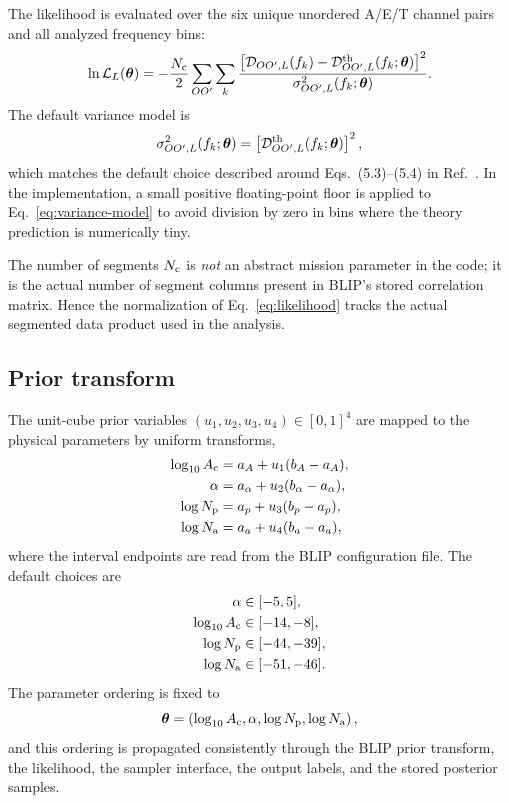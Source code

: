 \documentclass[11pt]{article}
\newcommand{\Nc}{N_{\rm c}}
\newcommand{\Dobs}{\mathcal{D}}
\newcommand{\Dth}{\mathcal{D}^{\rm th}}
\newcommand{\OO}{OO^\prime}
\newcommand{\vect}[1]{\bm{#1}}
\begin{document}
The likelihood is evaluated over the six unique unordered A/E/T channel pairs and all analyzed frequency bins:
\begin{equation}
  \ln \mathcal{L}_L(\vect{\theta})
  =
  -\frac{\Nc}{2}
  \sum_{\OO}
  \sum_{k}
  \frac{
    \left[
      \Dobs_{\OO,L}(f_k)
      -
      \Dth_{\OO,L}(f_k;\vect{\theta})
    \right]^2
  }{
    \sigma^2_{\OO,L}(f_k;\vect{\theta})
  }.
  \label{eq:likelihood}
\end{equation}
The default variance model is
\begin{equation}
  \sigma^2_{\OO,L}(f_k;\vect{\theta})
  =
  \left[
    \Dth_{\OO,L}(f_k;\vect{\theta})
  \right]^2,
  \label{eq:variance-model}
\end{equation}
which matches the default choice described around Eqs.~(5.3)--(5.4) in Ref.~\cite{LISAAnisotropyPaper}.  In the implementation, a small positive floating-point floor is applied to Eq.~\eqref{eq:variance-model} to avoid division by zero in bins where the theory prediction is numerically tiny.

The number of segments $\Nc$ is \emph{not} an abstract mission parameter in the code; it is the actual number of segment columns present in BLIP's stored correlation matrix.  Hence the normalization of Eq.~\eqref{eq:likelihood} tracks the actual segmented data product used in the analysis.

\subsection{Prior transform}

The unit-cube prior variables $(u_1,u_2,u_3,u_4)\in[0,1]^4$ are mapped to the physical parameters by uniform transforms,
\begin{align}
  \log_{10}A_{\rm c} &= a_A + u_1(b_A-a_A), \\
  \alpha             &= a_\alpha + u_2(b_\alpha-a_\alpha), \\
  \log N_{\rm p}     &= a_p + u_3(b_p-a_p), \\
  \log N_{\rm a}     &= a_a + u_4(b_a-a_a),
\end{align}
where the interval endpoints are read from the BLIP configuration file.  The default choices are
\begin{align}
  \alpha &\in [-5,5], \\
  \log_{10}A_{\rm c} &\in [-14,-8], \\
  \log N_{\rm p} &\in [-44,-39], \\
  \log N_{\rm a} &\in [-51,-46].
\end{align}
The parameter ordering is fixed to
\begin{equation}
  \vect{\theta}
  =
  \left(
  \log_{10}A_{\rm c},
  \alpha,
  \log N_{\rm p},
  \log N_{\rm a}
  \right),
  \label{eq:theta-ordering}
\end{equation}
and this ordering is propagated consistently through the BLIP prior transform, the likelihood, the sampler interface, the output labels, and the stored posterior samples.
\end{document}
